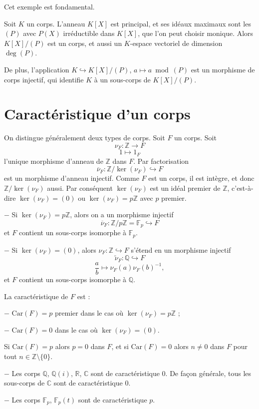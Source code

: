 \begin{exemple}
Cet exemple est fondamental.

Soit $K$ un corps. L'anneau $K[X]$ est principal, et ses idéaux maximaux sont les $(P)$ avec $P(X)$ irréductible dans $K[X]$, que l'on peut choisir monique. Alors $K[X]/(P)$ est un corps, et aussi un $K$-espace vectoriel de dimension $\deg(P)$.

De plus, l'application $K \hookrightarrow K[X]/(P)$, $a \mapsto a \bmod (P)$ est un morphisme de corps injectif, qui identifie $K$ à un sous-corps de $K[X]/(P)$.
\end{exemple}

\section{Caractéristique d'un corps}
On distingue généralement deux types de corps. Soit $F$ un corps. Soit
$$\nu_F : \mathbb{Z} \longrightarrow F$$
$$1 \longmapsto 1_F$$
l'unique morphisme d'anneau de $\mathbb{Z}$ dans $F$. Par factorisation
$$\overline{\nu}_F : \mathbb{Z}/\ker(\nu_F) \hookrightarrow F$$
est un morphisme d'anneau injectif. Comme $F$ est un corps, il est intègre, et donc $\mathbb{Z}/\ker(\nu_F)$ aussi. Par conséquent $\ker(\nu_F)$ est un idéal premier de $\mathbb{Z}$, c'est-à-dire $\ker(\nu_F) = (0)$ ou $\ker(\nu_F) = p\mathbb{Z}$ avec $p$ premier.

$-$ Si $\ker(\nu_F) = p\mathbb{Z}$, alors on a un morphisme injectif
$$\overline{\nu}_F : \mathbb{Z}/p\mathbb{Z} = \mathbb{F}_p \hookrightarrow F$$
et $F$ contient un sous-corps isomorphe à $\mathbb{F}_p$.

$-$ Si $\ker(\nu_F) = (0)$, alors $\nu_F : \mathbb{Z} \hookrightarrow F$ s'étend en un morphisme injectif
$$\widetilde{\nu}_F : \mathbb{Q} \hookrightarrow F$$
$$\frac{a}{b} \longmapsto \nu_F(a)\nu_F(b)^{-1},$$
et $F$ contient un sous-corps isomorphe à $\mathbb{Q}$.

\begin{definition}
La caractéristique de $F$ est :

$-$ $\text{Car}(F) = p$ premier dans le cas où $\ker(\nu_F) = p\mathbb{Z}$ ;

$-$ $\text{Car}(F) = 0$ dans le cas où $\ker(\nu_F) = (0)$.
\end{definition}

\begin{remarque}
Si $\text{Car}(F) = p$ alors $p = 0$ dans $F$, et si $\text{Car}(F) = 0$ alors $n \neq 0$ dans $F$ pour tout $n \in \mathbb{Z} \setminus \{0\}$.
\end{remarque}

\begin{exemple}
$-$ Les corps $\mathbb{Q}$, $\mathbb{Q}(i)$, $\mathbb{R}$, $\mathbb{C}$ sont de caractéristique $0$. De façon générale, tous les sous-corps de $\mathbb{C}$ sont de caractéristique $0$.

$-$ Les corps $\mathbb{F}_p$, $\mathbb{F}_p(t)$ sont de caractéristique $p$.
\end{exemple}
